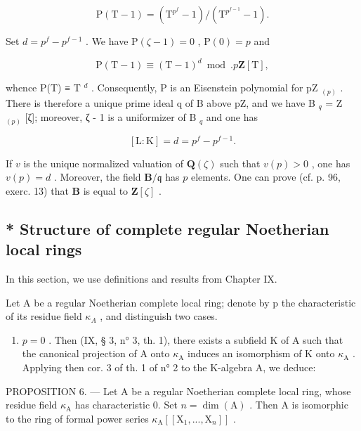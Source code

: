 \[
\mathrm{P} (\mathrm{T} - 1) = \left(\mathrm{T} ^ {p^{f}} - 1\right) / \left(\mathrm{T} ^ {p^{f - 1}} - 1\right).
\]

Set \(d = p^{f} - p^{f - 1}\) . We have \(\mathrm{P}(\zeta - 1) = 0\) , \(\mathrm{P}(0) = p\) and

\[
\mathrm{P} (\mathrm{T} - 1) \equiv (\mathrm{T} - 1) ^ {d} \bmod . p \mathbf {Z} [ \mathrm{T} ],
\]

whence P(T) ≡ T \(^{d}\) . Consequently, P is an Eisenstein polynomial for pZ \(_{(p)}\) . There is therefore a unique prime ideal q of B above pZ, and we have B \(_{q}\) = Z \(_{(p)}\) {[}ζ{]}; moreover, ζ - 1 is a uniformizer of B \(_{q}\) and one has

\[
[ \mathrm{L}: \mathrm{K} ] = d = p ^ {f} - p ^ {f - 1}.
\]

If \(v\) is the unique normalized valuation of \(\mathbf{Q}(\zeta)\) such that \(v(p)>0\) , one has \(v(p)=d\) . Moreover, the field \(\mathbf{B}/\mathfrak{q}\) has \(p\) elements. One can prove (cf. p. 96, exerc. 13) that \(\mathbf{B}\) is equal to \(\mathbf{Z}[\zeta]\) .



\subsection{* Structure of complete regular Noetherian local rings}

In this section, we use definitions and results from Chapter IX.

Let A be a regular Noetherian complete local ring; denote by p the characteristic of its residue field \(\kappa_{A}\) , and distinguish two cases.

\begin{enumerate}
\def\labelenumi{\Alph{enumi})}
\tightlist
\item
  \(p = 0\) . Then (IX, § 3, n° 3, th. 1), there exists a subfield K of A such that the canonical projection of A onto \(\kappa_{\mathrm{A}}\) induces an isomorphism of K onto \(\kappa_{\mathrm{A}}\) . Applying then cor. 3 of th. 1 of n° 2 to the K-algebra A, we deduce:
\end{enumerate}

PROPOSITION 6. --- Let A be a regular Noetherian complete local ring, whose residue field \(\kappa_{\mathrm{A}}\) has characteristic 0. Set \(n = \dim(\mathrm{A})\) . Then A is isomorphic to the ring of formal power series \(\kappa_{\mathrm{A}}[[\mathrm{X}_{1}, ..., \mathrm{X}_{n}]]\) .

